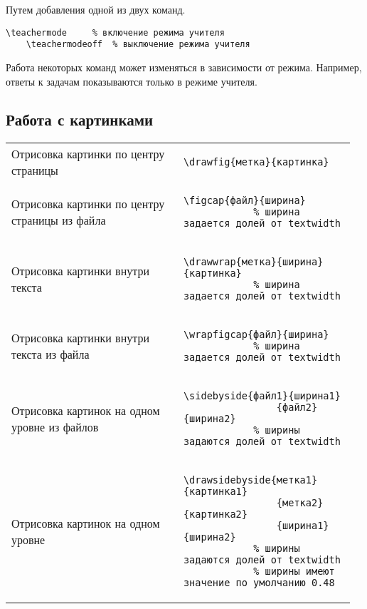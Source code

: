 Путем добавления одной из двух команд.

\begin{lstlisting}[gobble = 3]
    \teachermode     % включение режима учителя
    \teachermodeoff  % выключение режима учителя
\end{lstlisting}

Работа некоторых команд может изменяться в зависимости от режима. Например, ответы к задачам показываются
только в режиме учителя.


\subsection{Работа с картинками}

\noindent
\begin{tabular}{S{0.48\linewidth} S{0.485\linewidth}}
    Отрисовка картинки по центру страницы &
        \begin{lstlisting}[style = listtable, gobble = 10]
            \drawfig{метка}{картинка}
        \end{lstlisting} \\
    Отрисовка картинки по центру страницы из файла &
        \begin{lstlisting}[style = listtable, gobble = 10]
            \figcap{файл}{ширина}
            % ширина задается долей от textwidth
        \end{lstlisting} \\
    Отрисовка картинки внутри текста &
        \begin{lstlisting}[style = listtable, gobble = 10]
            \drawwrap{метка}{ширина}{картинка}
            % ширина задается долей от textwidth
        \end{lstlisting} \\
    Отрисовка картинки внутри текста из файла &
        \begin{lstlisting}[style = listtable, gobble = 10]
            \wrapfigcap{файл}{ширина}
            % ширина задается долей от textwidth
        \end{lstlisting} \\
    Отрисовка картинок на одном уровне из файлов &
        \begin{lstlisting}[style = listtable, gobble = 10]
            \sidebyside{файл1}{ширина1}
                {файл2}{ширина2}
            % ширины задаются долей от textwidth
        \end{lstlisting} \\
    Отрисовка картинок на одном уровне &
        \begin{lstlisting}[style = listtable, gobble = 10]
            \drawsidebyside{метка1}{картинка1}
                {метка2}{картинка2}
                {ширина1}{ширина2}
            % ширины задаются долей от textwidth
            % ширины имеют значение по умолчанию 0.48
        \end{lstlisting} \\
\end{tabular}
